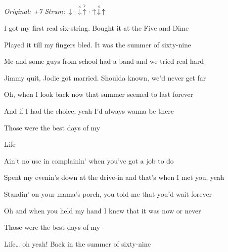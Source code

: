 \begin{song}


\begin{headerbox}
\RaiseBoxWithAccents
\textit{Original: +7} \quad
\textit{Strum:} $\Down\Miss\ChuckDown\AccentUp\Miss\Up\ChuckDown\Up$
\end{headerbox}

\begin{hchordbox}
\end{hchordbox}

\large

\bigskip

 I got my first real six-string.  Bought it at the Five and Dime \par
{} Played it till my fingers bled.  It was the summer of sixty-nine \par

\bigskip

 Me and some guys from school  had a band and we tried real hard \par
{} Jimmy quit, Jodie got married.  Shoulda known, we’d never get far \par

\bigskip

 Oh, when I look back now  that summer seemed to last forever \par
{} And if I had the choice,  yeah I’d always wanna be there \par
{} Those were the best days of my \par
{}Life    \par

\bigskip

 Ain’t no use in complainin’  when you’ve got a job to do \par
{} Spent my evenin’s down at the drive-in  and that’s when I met you, yeah \par

\bigskip

 Standin’ on your mama’s porch,  you told me that you’d wait forever \par
{} Oh and when you held my hand  I knew that it was now or never \par
{} Those were the best days of my \par
{}Life… oh yeah! Back in the summer of sixty-nine  \par


\end{song}
